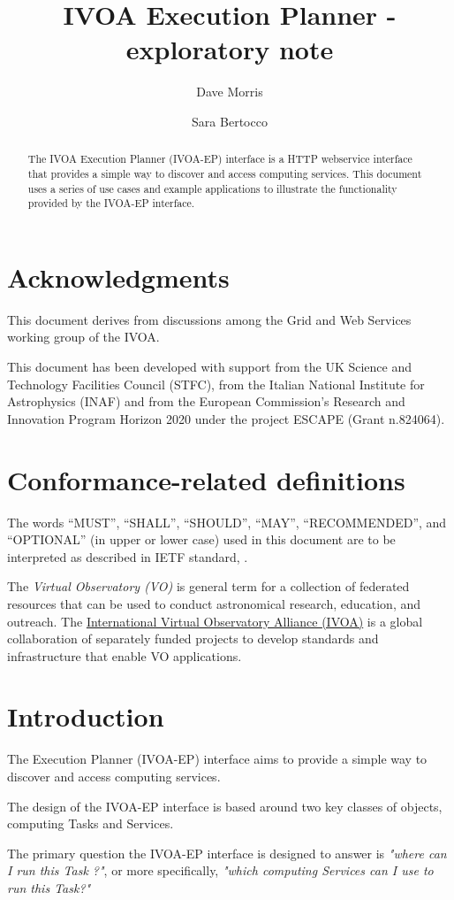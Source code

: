 \documentclass[11pt,a4paper]{ivoa}
\title{IVOA Execution Planner - exploratory note}
\author[https://wiki.ivoa.net/twiki/bin/view/IVOA/DaveMorris]{Dave Morris}
\author[https://wiki.ivoa.net/twiki/bin/view/IVOA/SaraBertocco]{Sara Bertocco}
\newcommand{\webservice} {webservice\xspace}
\newcommand{\ivoa} {IVOA\xspace}
\newcommand{\ivoep} {IVOA-EP\xspace}
\begin{document}
\begin{abstract}
The \ivoa Execution Planner (\ivoep) interface is a HTTP \webservice interface that provides a simple way to discover and access computing services. This document uses a series of use cases and example applications to illustrate the functionality provided by the \ivoep interface.
\end{abstract}

\section*{Acknowledgments}
\label{sec:acknowledgments}
This document derives from discussions among the Grid and Web Services working group of the IVOA.

This document has been developed with support from the UK Science and Technology Facilities Council (STFC), from the Italian National Institute for Astrophysics (INAF) and from the European Commission's Research and Innovation Program Horizon 2020 under the project ESCAPE (Grant n.824064).

\section*{Conformance-related definitions}
\label{sec:conformance-related-definitions}
The words ``MUST'', ``SHALL'', ``SHOULD'', ``MAY'', ``RECOMMENDED'', and ``OPTIONAL'' (in upper or lower case) used in this document are to be interpreted as described in IETF standard, \citep{std:RFC2119}.

The \emph{Virtual Observatory (VO)} is general term for a collection of federated resources that can be used
to conduct astronomical research, education, and outreach.
The \href{http://www.ivoa.net}{International
Virtual Observatory Alliance (IVOA)} is a global
collaboration of separately funded projects to develop standards and infrastructure that enable VO applications.

\section{Introduction}
\label{sec:introduction}
The Execution Planner (\ivoep) interface aims to provide a simple way to discover and access computing services.

The design of the \ivoep interface is based around two key classes of objects, computing Tasks and Services.

The primary question the \ivoep interface is designed to answer is \textit{"where can I run this Task ?"}, or more specifically, \textit{"which computing Services can I use to run this Task?"}
\end{document}
